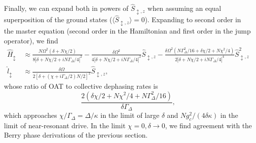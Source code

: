 \documentclass[11pt]{article}
\begin{document}
Finally, we can expand both in powers of $\hat S_{\updownarrow,z}$ when assuming an equal superposition of the ground states ($\langle \hat S_{\updownarrow,z} \rangle = 0$). Expanding to second order in the master equation (second order in the Hamiltonian and first order in the jump operator), we find
\begin{subequations}
    \begin{align}
        \hat H_{\updownarrow} &~ \approx \frac{N \Omega^2 (\delta + N \chi/2) }{8| \delta + N \chi/2 + i N \Gamma_\Delta/4|^2} - \frac{ \delta \Omega^2 }{4 | \delta + N \chi/2 + i N \Gamma_\Delta/4|^2} \hat S_{\updownarrow,z} - \frac{ \delta \Omega^2 (N \Gamma_\Delta^2/16 +  \delta \chi/2 + N \chi^2/4) }{2 |\delta + N \chi/2 + i N \Gamma_\Delta /4|^4} \hat S_{\updownarrow,z}^2 \\
        \hat l_{\updownarrow} &~ \approx  \frac{\delta \Omega }{2[ \delta + (\chi + i \Gamma_\Delta/2) N/2]^2}\hat S_{\updownarrow,z},
    \end{align}
\end{subequations}
whose ratio of OAT to collective dephasing rates is
\begin{equation}
    \frac{2 (\delta \chi/2 + N \chi^2/4 + N\Gamma_\Delta^2/16)}{\delta \Gamma_\Delta},
\end{equation}
which approaches $\chi/\Gamma_\Delta = \Delta/\kappa$ in the limit of large $\delta$ and $N g_c^2 /(4 \delta \kappa)$ in the limit of near-resonant drive. In the limit $\chi = 0, \delta \to 0$, we find agreement with the Berry phase derivations of the previous section.
\end{document}
